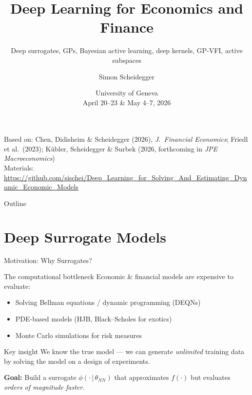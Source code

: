 \documentclass[aspectratio=169,11pt]{beamer}
\title[Deep Learning -- Geneva 2026]%
{Deep Learning for Economics and Finance}
\subtitle{Deep surrogates, GPs, Bayesian active learning, deep kernels, GP-VFI, active subspaces}
\author{Simon Scheidegger}
\institute[HEC Lausanne]{HEC, University of Lausanne}
\date{University of Geneva\\April 20--23 \& May 4--7, 2026}
\newcommand{\emphc}[1]{\textcolor{harvardcrimson}{#1}}
\begin{document}
\newcommand{\exercisepause}{%
  \tikz[baseline=(X.base)]{\node[fill=darkgreen!80!black, text=white,
  rounded corners=2pt, inner sep=3pt, font=\scriptsize\bfseries](X){PAUSE --- 5 min};}}


{
\begin{frame}
\titlepage
\vspace{-0.4cm}
\begin{center}
{\footnotesize Based on: Chen, Didisheim \& Scheidegger (2026), \emph{J.\ Financial Economics}; Friedl et al.\ (2023); K\"ubler, Scheidegger \& Surbek (2026, forthcoming in \emph{JPE Macroeconomics})}\\[4pt]
{\footnotesize Materials: \url{https://github.com/sischei/Deep_Learning_for_Solving_And_Estimating_Dynamic_Economic_Models}}
\end{center}
\end{frame}
}

\begin{frame}{Outline}
\tableofcontents
\end{frame}

\section{Deep Surrogate Models}

\begin{frame}{Motivation: Why Surrogates?}
\begin{block}{The computational bottleneck}
Economic \& financial models are expensive to evaluate:
\begin{itemize}
  \item Solving Bellman equations / dynamic programming (DEQNs)
  \item PDE-based models (HJB, Black--Scholes for exotics)
  \item Monte Carlo simulations for risk measures
\end{itemize}
\end{block}

\vspace{0.3cm}
\begin{alertblock}{Key insight}
\emphc{We know the true model} --- we can generate \emph{unlimited} training data by solving the model on a design of experiments.
\end{alertblock}

\vspace{0.3cm}
\textbf{Goal:} Build a \emphc{surrogate} $\phi(\cdot\,|\,\theta_{NN})$ that approximates $f(\cdot)$ but evaluates \emph{orders of magnitude faster}.
\end{frame}
\end{document}
